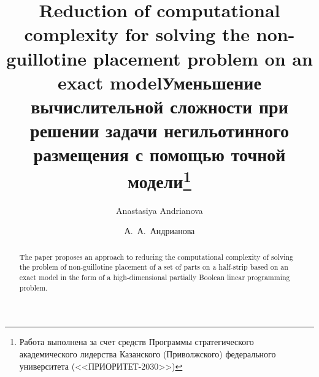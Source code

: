 \begin{englishtitle} %
\title{Reduction of computational complexity for solving the non-guillotine placement problem on an exact model}
\author{Anastasiya Andrianova 
}
\maketitle

\begin{abstract}
The paper proposes an approach to reducing the computational complexity of solving the problem of non-guillotine placement of a set of parts on a half-strip based on an exact model in the form of a high-dimensional partially Boolean linear programming problem.

\end{abstract}
\end{englishtitle}

\iffalse
%
%


\documentclass[12pt]{llncs}  


\usepackage{iftex}

\ifPDFTeX
\usepackage[T2A]{fontenc}
\usepackage[utf8]{inputenc} %
\usepackage[english,russian]{babel}
\fi

\usepackage{todonotes} 

\usepackage[russian]{nla}


\fi


\title{Уменьшение вычислительной сложности при решении задачи негильотинного размещения с помощью точной модели\thanks{ Работа выполнена за счет средств Программы стратегического академического лидерства Казанского
(Приволжского) федерального университета (<<ПРИОРИТЕТ-2030>>)}}
\author{А.~А.~Андрианова
}

